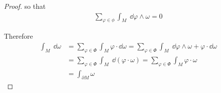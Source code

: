 \begin{proof}
    so that 
    \begin{align*}
        \sum_{\varphi\in\phi}^{}{\int_M \;\dd\varphi\wedge\omega} = 0
    \end{align*}

    Therefore 
    \begin{align*}
        \int_M\;\dd\omega
        & = \sum_{\varphi\in\Phi}\int_M\varphi\cdot \dd\omega
            = \sum_{\varphi\in\Phi}\int_M\;\dd\varphi\wedge\omega+\varphi\cdot \dd\omega \\
        & = \sum_{\varphi\in\Phi}\int_M\;\dd(\varphi\cdot\omega)
            = \sum_{\varphi\in\Phi}\int_M\varphi\cdot\omega  \\
        & = \int_{\partial M}\omega
    \end{align*}
\end{proof}

